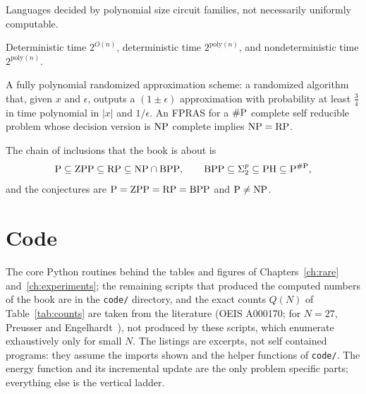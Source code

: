 \begin{description}[style=nextline]
\item[$\Ppoly$] Languages decided by polynomial size circuit families, not necessarily uniformly computable.
\item[$\mathrm{E}$, $\mathrm{EXP}$, $\mathrm{NEXP}$] Deterministic time $2^{O(n)}$, deterministic time $2^{\mathrm{poly}(n)}$, and nondeterministic time $2^{\mathrm{poly}(n)}$.
\item[FPRAS] A fully polynomial randomized approximation scheme: a randomized algorithm that, given $x$ and $\epsilon$, outputs a $(1 \pm \epsilon)$ approximation with probability at least $\tfrac34$ in time polynomial in $|x|$ and $1/\epsilon$. An FPRAS for a $\#\mathrm{P}$ complete self reducible problem whose decision version is $\mathrm{NP}$ complete implies $\mathrm{NP} = \mathrm{RP}$.
\end{description}

The chain of inclusions that the book is about is
\[
\mathrm{P} \subseteq \mathrm{ZPP} \subseteq \mathrm{RP} \subseteq \mathrm{NP} \cap \mathrm{BPP} , \qquad \mathrm{BPP} \subseteq \Sigma_2^p \subseteq \mathrm{PH} \subseteq \mathrm{P}^{\#\mathrm{P}} ,
\]
and the conjectures are $\mathrm{P} = \mathrm{ZPP} = \mathrm{RP} = \mathrm{BPP}$ and $\mathrm{P} \neq \mathrm{NP}$.

\chapter{Code}
\label{app:code}

The core Python routines behind the tables and figures of Chapters~\ref{ch:rare} and~\ref{ch:experiments}; the remaining scripts that produced the computed numbers of the book are in the \texttt{code/} directory, and the exact counts $Q(N)$ of Table~\ref{tab:counts} are taken from the literature (OEIS A000170; for $N = 27$, Preusser and Engelhardt~\cite{PreusserEngelhardt}), not produced by these scripts, which enumerate exhaustively only for small $N$. The listings are excerpts, not self contained programs: they assume the imports shown and the helper functions of \texttt{code/}. The energy function and its incremental update are the only problem specific parts; everything else is the vertical ladder.

